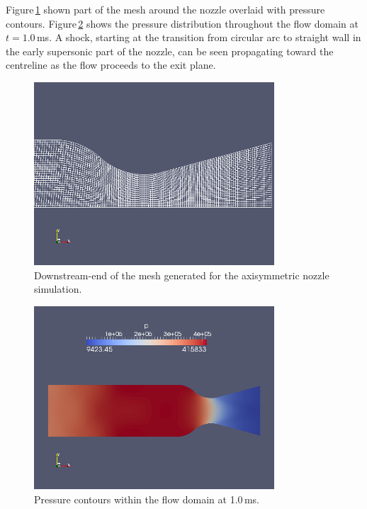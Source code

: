 Figure\,\ref{back-mesh-fig} shown part of the mesh around the nozzle
overlaid with pressure contours.
Figure\,\ref{back-pressure-contours-fig} shows the pressure distribution
throughout the flow domain at $t = 1.0$\,ms.
A shock, starting at the transition from circular arc to straight wall
in the early supersonic part of the nozzle, can be seen propagating
toward the centreline as the flow proceeds to the exit plane.

\begin{figure}[htbp]
\begin{center}
\includegraphics[width=0.8\textwidth]{../2D/back-nozzle/back-mesh.png}
\end{center}
\caption{Downstream-end of the mesh generated for the axisymmetric nozzle simulation.}
\label{back-mesh-fig}
\end{figure}

\begin{figure}[htbp]
\begin{center}
\includegraphics[width=0.8\textwidth]{../2D/back-nozzle/back-p-field.png}
\end{center}
\caption{Pressure contours within the flow domain at 1.0\,ms.}
\label{back-pressure-contours-fig}
\end{figure}


